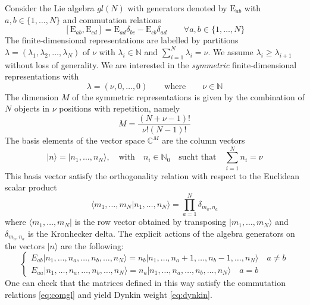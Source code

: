 \documentclass[11pt]{article}
\numberwithin{equation}{section}
\numberwithin{equation}{subsection}
\newcommand{\EE}{\mathrm{E}}
\newcommand{\twoj}{\nu}
\begin{document}
Consider the Lie algebra $gl(N)$ with generators denoted by $\EE_{ab}$ with $a,b\in \{1,\ldots,N\}$ and commutation relations
\begin{equation}\label{eq:comgl}
\left[\EE_{ab},\EE_{cd}\right]=\EE_{ad}\delta_{bc}-\EE_{cb}\delta_{ad}\qquad \forall a,b\in \{1,\ldots,N\}
\end{equation}
The finite-dimensional representations are labelled by partitions $\lambda=(\lambda_1,\lambda_2,\ldots,\lambda_N)$ of $\nu$ with $\lambda_i\in \mathbb{N}$ and $\sum_{i=1}^N \lambda_i = \nu$. We assume $\lambda_i\geq \lambda_{i+1}$ without loss of generality.
We are interested in the {\em symmetric} finite-dimensional representations with 
\begin{equation}\label{eq:dynkin}
    \lambda=(\twoj,0,\ldots,0) \qquad\text{where}\qquad \twoj\in\mathbb{N}
\end{equation} 
The dimension $M$ of the symmetric representations is given by the combination of $N$ objects in $\twoj$ positions with repetition, namely
\begin{equation}
	M= \frac{(N+\twoj-1)!}{\twoj  !(N-1)!}
\end{equation} 
The basis elements of the vector space $\mathbb{C}^{M}$ are the column vectors 
\begin{equation}
  |n\rangle=  |n_{1},\ldots,n_{N}\rangle,\quad \text{with}\quad n_{i}\in\mathbb{N}_{0}\quad \text{sucht that}\quad \sum_{i=1}^{N}n_{i}=\nu
\end{equation}
This basis vector satisfy the orthogonality relation with respect to the Euclidean scalar product 
\begin{equation}\label{ortho}
    \langle m_{1},\ldots,m_{N}|n_{1},\ldots,n_{N}\rangle=\prod_{a=1}^{N}\delta_{m_{a},n_{a}}
\end{equation}
where  $ \langle m_{1},\ldots,m_{N}|$ is the row vector obtained by transposing $|m_{1},\ldots,m_{N}\rangle$ and $\delta_{m_{a},n_{a}}$ is the Kronhecker delta. 
The explicit actions of the algebra generators on the vectors $|n\rangle$ are the following:
\begin{equation}\label{actionE}
	\begin{cases}
		E_{ab}|n_{1},\ldots,n_{a},\ldots,n_{b},\ldots,n_{N}\rangle =n_{b}|n_{1},\ldots,n_{a}+1,\ldots,n_{b}-1,\ldots,n_{N}\rangle\quad a\neq b\\[0.1cm]
		E_{aa}|n_{1},\ldots,n_{a},\ldots,n_{b},\ldots,n_{N}\rangle = n_{a} |n_{1},\ldots,n_{a},\ldots,n_{b},\ldots,n_{N}\rangle\quad a=b
	\end{cases}
\end{equation}  
One can check that the matrices defined in this way satisfy the commutation relations \eqref{eq:comgl} and yield Dynkin weight \eqref{eq:dynkin}.
\end{document}
